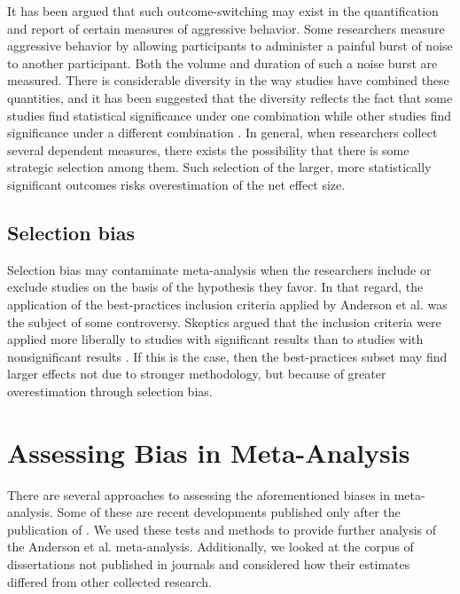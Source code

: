 \documentclass[man, mask]{apa6}
\begin{document}
It has been argued that such outcome-switching may exist in the quantification and report of certain measures of aggressive behavior. Some researchers measure aggressive behavior by allowing participants to administer a painful burst of noise to another participant. Both the volume and duration of such a noise burst are measured.  There is considerable diversity in the way studies have combined these quantities, and it has been suggested that the diversity reflects the fact that some studies find statistical significance under one combination while other studies find significance under a different combination \citep{Elson:etal:2014}.  In general, when researchers collect several dependent measures, there exists the possibility that there is some strategic selection among them. Such selection of the larger, more statistically significant outcomes risks overestimation of the net effect size. 

\subsection{Selection bias}
Selection bias may contaminate meta-analysis when the researchers include or exclude studies on the basis of the hypothesis they favor. In that regard, the application of the best-practices inclusion criteria applied by Anderson et al. was the subject of some controversy. Skeptics argued that the inclusion criteria were applied more liberally to studies with significant results than to studies with nonsignificant results \citep{Ferguson:Kilburn:2010}. If this is the case, then the best-practices subset may find larger effects not due to stronger methodology, but because of greater overestimation through selection bias. 

\section{Assessing Bias in Meta-Analysis}
There are several approaches to assessing the aforementioned biases in meta-analysis. Some of these are recent developments published only after the publication of \citet{Anderson:etal:2010}. We used these tests and methods to provide further analysis of the Anderson et al. meta-analysis. Additionally, we looked at the corpus of dissertations not published in journals and considered how their estimates differed from other collected research.
\end{document}
